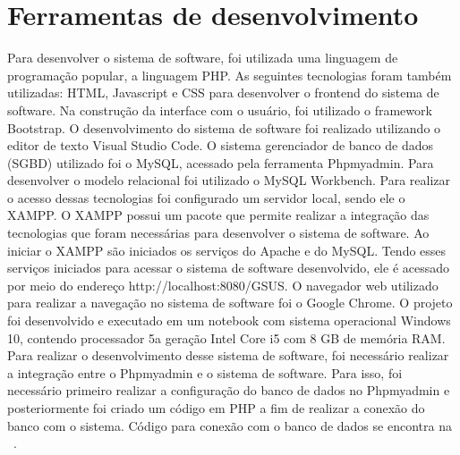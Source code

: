 \section{Ferramentas de desenvolvimento}
Para desenvolver o sistema de software, foi utilizada uma linguagem de programação popular, a linguagem PHP. As seguintes tecnologias foram também utilizadas: \acrfull{HTML}, Javascript e \acrfull{CSS} para desenvolver o frontend do sistema de software. Na construção da interface com o usuário, foi utilizado o framework Bootstrap. O desenvolvimento do sistema de software foi realizado utilizando o editor de texto Visual Studio Code. O sistema gerenciador de banco de dados (SGBD) utilizado foi o MySQL, acessado pela ferramenta Phpmyadmin. Para desenvolver o modelo relacional foi utilizado o MySQL Workbench. Para realizar o acesso dessas tecnologias foi configurado um servidor local, sendo ele o XAMPP. O XAMPP possui um pacote que permite realizar a integração das tecnologias que foram necessárias para desenvolver o sistema de software. Ao iniciar o XAMPP são iniciados os serviços do Apache e do MySQL. Tendo esses serviços iniciados para acessar o sistema de software desenvolvido, ele é acessado por meio do endereço http://localhost:8080/GSUS. O navegador web utilizado para realizar a navegação no sistema de software foi o Google Chrome. O projeto foi desenvolvido e executado em um notebook com sistema operacional Windows 10, contendo processador 5a geração Intel Core i5 com 8 GB de memória RAM. Para realizar o desenvolvimento desse sistema de software, foi necessário realizar a integração entre o Phpmyadmin e o sistema de software. Para isso, foi necessário primeiro realizar a configuração do banco de dados no Phpmyadmin e posteriormente foi criado um código em PHP a fim de realizar a conexão do banco com o sistema. Código para conexão com o banco de dados se encontra na ~.


%